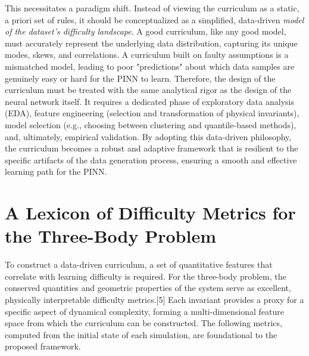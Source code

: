 \documentclass[11pt, letterpaper]{article}
\begin{document}
This necessitates a paradigm shift. Instead of viewing the curriculum as a static, a priori set of rules, it should be conceptualized as a simplified, data-driven \textit{model of the dataset's difficulty landscape}. A good curriculum, like any good model, must accurately represent the underlying data distribution, capturing its unique modes, skews, and correlations. A curriculum built on faulty assumptions is a mismatched model, leading to poor "predictions" about which data samples are genuinely easy or hard for the PINN to learn. Therefore, the design of the curriculum must be treated with the same analytical rigor as the design of the neural network itself. It requires a dedicated phase of exploratory data analysis (EDA), feature engineering (selection and transformation of physical invariants), model selection (e.g., choosing between clustering and quantile-based methods), and, ultimately, empirical validation. By adopting this data-driven philosophy, the curriculum becomes a robust and adaptive framework that is resilient to the specific artifacts of the data generation process, ensuring a smooth and effective learning path for the PINN.

\section{A Lexicon of Difficulty Metrics for the Three-Body Problem}

To construct a data-driven curriculum, a set of quantitative features that correlate with learning difficulty is required. For the three-body problem, the conserved quantities and geometric properties of the system serve as excellent, physically interpretable difficulty metrics.[5] Each invariant provides a proxy for a specific aspect of dynamical complexity, forming a multi-dimensional feature space from which the curriculum can be constructed. The following metrics, computed from the initial state of each simulation, are foundational to the proposed framework.
\end{document}
